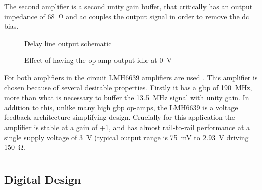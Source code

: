 The second amplifier is a second unity gain buffer, that critically has an output impedance of \SI{68}{\ohm} and \gls{ac} couples the output signal in order to remove the \gls{dc} bias.

\begin{figure}[ht]
	\centering
	\caption{Delay line output schematic }
	\label{fig:delay-line-output-sch}
\end{figure}

\begin{figure}[ht]
	\centering
	\dummyfigure
	\caption{Effect of having the op-amp output idle at \SI{0}{\volt}}
	\label{fig:delay-line-output-coupling}
\end{figure}

For both amplifiers in the circuit LMH6639 amplifiers are used \cite{ti2013}. This amplifier is chosen because of several desirable properties. Firstly it has a \gls{gbp} of \SI{190}{\mega\hertz}, more than what is necessary to buffer the \SI{13.5}{\mega\hertz} signal with unity gain. In addition to this, unlike many high \gls{gbp} op-amps, the LMH6639 is a voltage feedback architecture simplifying design. Crucially for this application the amplifier is stable at a gain of +1, and has almost rail-to-rail performance at a single supply voltage of \SI{3}{\volt} (typical output range is \SI{75}{\milli\volt} to \SI{2.93}{\volt} driving \SI{150}{\ohm}.


\chapter{}

\section{Digital Design}

